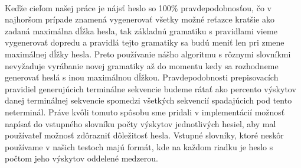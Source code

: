 \paragraph{}
Keďže cieľom našej práce je nájsť heslo so 100\% pravdepodobnosťou, čo v najhoršom prípade znamená vygenerovať všetky možné reťazce kratšie ako zadaná maximálna dĺžka hesla, tak základnú gramatiku s pravidlami vieme vygenerovať dopredu a pravidlá tejto gramatiky sa budú meniť len pri zmene maximálnej dĺžky hesla. Preto používanie nášho algoritmu s rôznymi slovníkmi nevyžaduje vyrábanie novej gramatiky až do momentu kedy sa rozhodneme generovať heslá s inou maximálnou dĺžkou. Pravdepodobnosti prepisovacích pravidiel generujúcich terminálne sekvencie budeme rátať ako percento výskytov danej terminálnej sekvencie spomedzi všetkých sekvencií spadajúcich pod tento neterminál. Práve kvôli tomuto spôsobu sme pridali v implementácií možnosť napísať do vstupného slovníku počty výskytov jednotlivých hesiel, aby mal používateľ možnosť zdôrazniť dôležitosť hesla. Vstupné slovníky, ktoré neskôr používame v našich testoch majú formát, kde na každom riadku je heslo s počtom jeho výskytov oddelené medzerou. 

